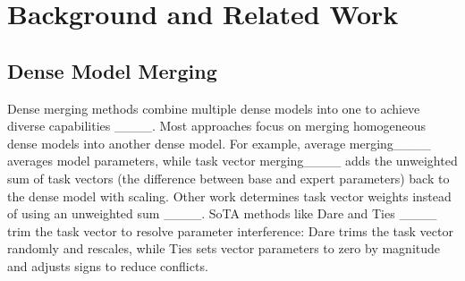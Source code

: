 \section{Background and Related Work}

\subsection{Dense Model Merging}


Dense merging methods combine multiple dense models into one to achieve diverse capabilities ____. Most approaches focus on merging homogeneous dense models into another dense model. For example, average merging____ averages model parameters, while task vector merging____ adds the unweighted sum of task vectors (the difference between base and expert parameters) back to the dense model with scaling. Other work determines task vector weights instead of using an unweighted sum ____. SoTA methods like Dare and Ties ____ trim the task vector to resolve parameter interference: Dare trims the task vector randomly and rescales, while Ties sets vector parameters to zero by magnitude and adjusts signs to reduce conflicts.


